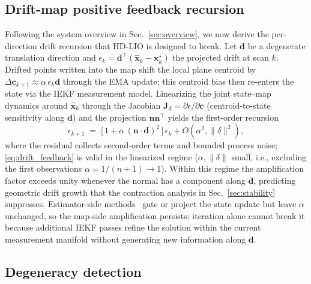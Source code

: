 \documentclass[conference]{IEEEtran}
\newcommand{\xhat}{\hat{\mathbf{x}}}
\newcommand{\bvec}[1]{\mathbf{#1}}
\begin{document}
\subsection{Drift-map positive feedback recursion}\label{sec:drift_recursion}

Following the system overview in Sec.~\ref{sec:overview}, we now
derive the per-direction drift recursion that HD-LIO is designed to
break. Let $\bvec{d}$ be a degenerate translation direction and
$\epsilon_k {=} \bvec{d}^\top(\xhat_k {-} \bvec{x}_k^\star)$ the
projected drift at scan $k$. Drifted points written into the map shift
the local plane centroid by
$\Delta\bvec{c}_{k+1} {\approx} \alpha\,\epsilon_k\bvec{d}$ through
the EMA update; this centroid bias then re-enters the state via the
IEKF measurement model. Linearizing the joint state--map dynamics
around $\xhat_k$ through the Jacobian $\bvec{J}_d {=} \partial\epsilon/\partial\bvec{c}$
(centroid-to-state sensitivity along $\bvec{d}$) and the projection
$\bvec{n}\bvec{n}^\top$ yields the first-order recursion
\begin{equation}\label{eq:drift_feedback}
  \epsilon_{k+1} \;=\;
  \bigl[\,1 + \alpha\,(\bvec{n}\cdot\bvec{d})^2\,\bigr]\,\epsilon_k
   + O(\alpha^2,\|\delta\|^2),
\end{equation}
where the residual collects second-order terms and bounded process
noise; \eqref{eq:drift_feedback} is valid in the linearized regime
($\alpha,\|\delta\|$ small, i.e., excluding the first observations
$\alpha=1/(n{+}1){\to}1$). Within this regime the amplification
factor exceeds unity whenever the normal has a component along
$\bvec{d}$, predicting geometric drift growth that the contraction
analysis in Sec.~\ref{sec:stability} suppresses. Estimator-side methods~\cite{zhang2016degeneracy,
li2025lodestar} gate or project the state update but leave $\alpha$
unchanged, so the map-side amplification persists; iteration alone
cannot break it because additional IEKF passes refine the solution
within the current measurement manifold without generating new
information along $\bvec{d}$.

\subsection{Degeneracy detection}
\end{document}
